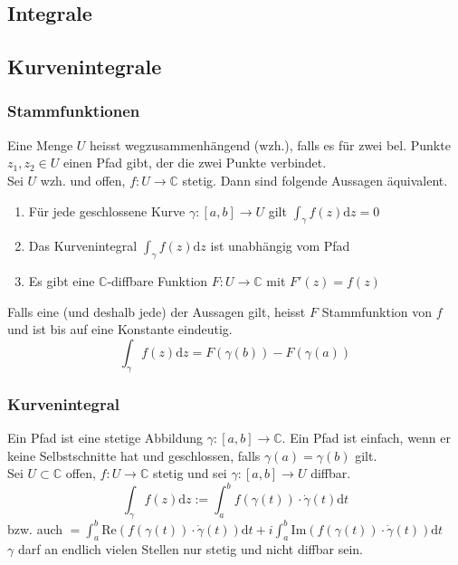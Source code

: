 \documentclass[8pt, a4paper, landscape, fleqn]{scrartcl}
\def\C{\mathbb{C}}
\def\d{\text{d}}
\def\Re{\text{Re}}
\def\Im{\text{Im}}
\newcommand{\blue}[1]{\textcolor{ethblue}{#1}}
\begin{document}
\begin{multicols*}{3}
        \section{Integrale}
        \subsection{Kurvenintegrale}
        \subsubsection{Stammfunktionen}
        Eine Menge $U$ heisst \blue{wegzusammenhängend (wzh.)}, falls es für zwei bel. Punkte $z_1, z_2 \in U$ einen Pfad gibt, der die zwei Punkte verbindet. \\
        
        Sei $U$ wzh. und offen, $f: U\to\C$ stetig. Dann sind folgende Aussagen äquivalent. 
        \begin{enumerate}
            \item Für jede geschlossene Kurve $\gamma : [a, b]\to U$ gilt $\int_\gamma f(z)\d z = 0$
            \item Das Kurvenintegral $\int_\gamma f(z)\d z$ ist unabhängig vom Pfad
            \item Es gibt eine $\C$-diffbare Funktion $F : U\to\C$ mit $F'(z) = f(z)$
        \end{enumerate}
        Falls eine (und deshalb jede) der Aussagen gilt, heisst $F$ Stammfunktion von $f$ und ist bis auf eine Konstante eindeutig. $$\int_\gamma f(z)\d z = F(\gamma(b)) - F(\gamma(a))$$
        
        
        \subsubsection{Kurvenintegral}
        Ein \blue{Pfad} ist eine stetige Abbildung $\gamma : [a, b]\to\C$. Ein Pfad ist einfach, wenn er keine Selbstschnitte hat und geschlossen, falls $\gamma(a) = \gamma(b)$ gilt. \\
        
        Sei $U\subset \C$ offen, $f:U\to\C$ stetig und sei $\gamma : [a, b] \to U$ diffbar. $$ \int_\gamma f(z) \d z := \int_a^b f(\gamma(t))\cdot \dot{\gamma}(t)\d t $$
        bzw. auch $= \int_a^b \Re(f(\gamma(t))\cdot\dot{\gamma}(t))\d t + i \int_a^b \Im(f(\gamma(t))\cdot\dot{\gamma}(t))\d t$ \\
        $\gamma$ darf an endlich vielen Stellen nur stetig und nicht diffbar sein. \\
        

\end{multicols*}
\end{document}

